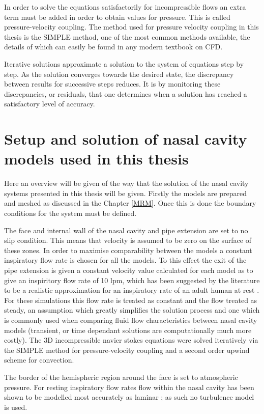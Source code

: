 In order to solve the equations satisfactorily for incompressible flows an extra term must be added in order to obtain values for pressure. This is called pressure-velocity coupling. The method used for pressure velocity coupling in this thesis is the SIMPLE method, one of the most common methods available, the details of which can easily be found in any modern textbook on CFD.

Iterative solutions approximate a solution to the system of equations step by step. As the solution converges towards the desired state, the discrepancy between results for successive steps reduces. It is by monitoring these discrepancies, or residuals, that one determines when a solution has reached a satisfactory level of accuracy. 

\section{Setup and solution of nasal cavity models used in this thesis}
Here an overview will be given of the way that the solution of the nasal cavity systems presented in this thesis will be given. Firstly the models are prepared and meshed as discussed in the Chapter \ref{MRM}. Once this is done the boundary conditions for the system must be defined. 

The face and internal wall of the nasal cavity and pipe extension are set to no slip condition. This means that velocity is assumed to be zero on the surface of these zones. In order to maximise comparability between the models a constant inspiratory flow rate is chosen for all the models. To this effect the exit of the pipe extension is given a constant velocity value calculated for each model as to give an inspiritory flow rate of 10 lpm, which has been suggested by the literature to be a realistic approximation for an inspiratory rate of an adult human at rest \cite{Wen2008, Subramaniam1998}. For these simulations this flow rate is treated as constant and the flow treated as steady, an assumption which greatly simplifies the solution process and one which is commonly used when comparing fluid flow characteristics between nasal cavity models (transient, or time dependant solutions are computationally much more costly). The 3D incompressible navier stokes equations were solved iteratively via the SIMPLE method for pressure-velocity coupling and a second order upwind scheme for convection.

The border of the hemispheric region around the face is set to atmospheric pressure. For resting inspiratory flow rates flow within the nasal cavity has been shown to be modelled most accurately as laminar \cite{Doorly2008, Hahn1993}; as such no turbulence model is used.

